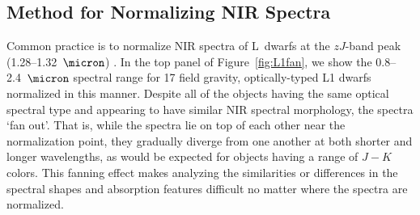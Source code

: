 \documentclass[12pt,preprint]{aastex}
\begin{document}
\subsection{Method for Normalizing NIR Spectra}
\label{sec:method}

Common practice is to normalize NIR spectra of L~dwarfs at the $zJ$-band peak (1.28--1.32~$\micron$) \citep[e.g.,][]{Kirkpatrick10}. 
In the top panel of Figure~\ref{fig:L1fan}, we show the 0.8--2.4~$\micron$ spectral range for 17 field gravity, optically-typed L1 dwarfs normalized in this manner.
Despite all of the objects having the same optical spectral type and appearing to have similar NIR spectral morphology, the spectra `fan out'. 
That is, while the spectra lie on top of each other near the normalization point, they gradually diverge from one another at both shorter and longer wavelengths, as would be expected for objects having a range of $J-K$ colors. 
This fanning effect makes analyzing the similarities or differences in the spectral shapes and absorption features difficult no matter where the spectra are normalized.

\end{document}
